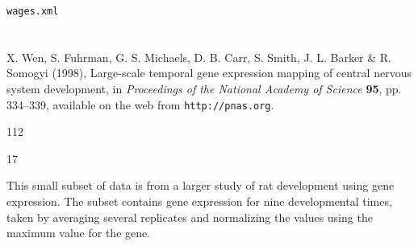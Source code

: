 \bigskip
{}

\smallskip 
{\tt wages.xml}

\section{}

 X. Wen, S. Fuhrman, G. S. Michaels, D. B. Carr,
S. Smith, J. L. Barker \& R. Somogyi (1998), Large-scale temporal gene
expression mapping of central nervous system development, in {\em
Proceedings of the National Academy of Science} {\bf 95}, pp. 334--339,
available on the web from {\tt http://pnas.org}. \nocite{WFMC1998}

\bigskip
{} 112

 17

\smallskip
{} This small subset of data is from a larger 
study of rat development using gene expression.  The subset contains
gene expression for nine developmental times, taken by averaging several
replicates and normalizing the values using the maximum value for the
gene.  


